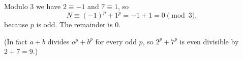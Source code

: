 Modulo $3$ we have $2\equiv-1$ and $7\equiv1$, so
\[N\equiv(-1)^p+1^p=-1+1=0\pmod3,\]
because $p$ is odd. The remainder is $\boxed{0}$.

(In fact $a+b$ divides $a^p+b^p$ for every odd $p$, so $2^p+7^p$ is even divisible by $2+7=9$.)
